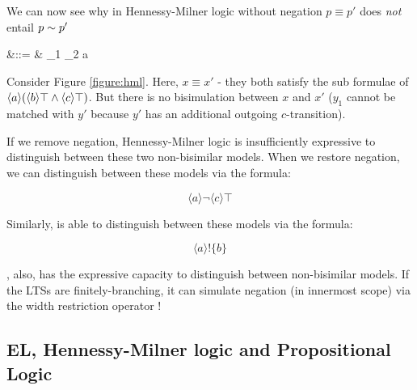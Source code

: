 We can now see why in Hennessy-Milner logic without negation $p \equiv
p'$ does \emph{not} entail $p \sim p'$

\begin{GRAMMAR}
  \phi 
    &\quad ::= \quad&
  \top \fOr \phi_1 \AND \phi_2  \fOr \langle a \rangle \phi
\end{GRAMMAR}



\NI Consider Figure \ref{figure:hml}.  Here, $x \equiv x'$ - they both
satisfy the sub formulae of $\langle a \rangle (\langle b \rangle \top
\land \langle c \rangle \top)$.  But there is no bisimulation between
$x$ and $x'$ ($y_1$ cannot be matched with $y'$ because $y'$ has an
additional outgoing $c$-transition).

If we remove negation, Hennessy-Milner logic is insufficiently expressive to distinguish
between these two non-bisimilar models.  When we restore negation, we
can distinguish between these models via the formula:

\[
   \langle a \rangle \neg \langle c \rangle \top
\]

\NI Similarly, \ELABR{} is able to distinguish between these models via the
formula:

\[
  \langle a \rangle ! \{b\}
\]

\NI \ELABR{}, also, has the expressive capacity to distinguish between
non-bisimilar models. If the LTSs are finitely-branching, it can
simulate negation (in innermost scope) via the width restriction
operator !

\subsection{EL, Hennessy-Milner logic and Propositional Logic}


